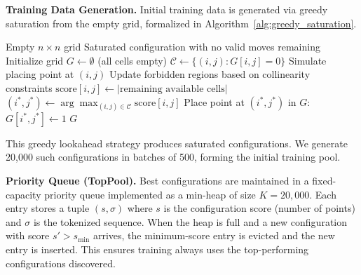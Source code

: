 \documentclass{article}
\theoremstyle{plain}
\theoremstyle{definition}
\theoremstyle{remark}
\begin{document}
\textbf{Training Data Generation.} Initial training data is generated via greedy saturation from the empty grid, formalized in Algorithm~\ref{alg:greedy_saturation}.
\begin{algorithm}[htbp]
\caption{Greedy Saturation for Training Data Generation}
\label{alg:greedy_saturation}
\begin{algorithmic}[1]
 Empty $n \times n$ grid
 Saturated configuration with no valid moves remaining
\STATE Initialize grid $G \gets \emptyset$ (all cells empty)
    \STATE $\mathcal{C} \gets \{(i,j) : G[i,j] = 0\}$ 
        \STATE Simulate placing point at $(i,j)$
        \STATE Update forbidden regions based on collinearity constraints
        \STATE $\text{score}[i,j] \gets |\text{remaining available cells}|$
    \ENDFOR
    \STATE $(i^*, j^*) \gets \arg\max_{(i,j) \in \mathcal{C}} \text{score}[i,j]$ 
    \STATE Place point at $(i^*, j^*)$ in $G$: $G[i^*, j^*] \gets 1$
\ENDWHILE
{} $G$
\end{algorithmic}
\end{algorithm}
This greedy lookahead strategy produces saturated configurations. We generate 20,000 such configurations in batches of 500, forming the initial training pool.

\textbf{Priority Queue (TopPool).} Best configurations are maintained in a fixed-capacity priority queue implemented as a min-heap of size $K = 20{,}000$. Each entry stores a tuple $(s, \sigma)$ where $s$ is the configuration score (number of points) and $\sigma$ is the tokenized sequence. When the heap is full and a new configuration with score $s' > s_{\min}$ arrives, the minimum-score entry is evicted and the new entry is inserted. This ensures training always uses the top-performing configurations discovered.
\end{document}
